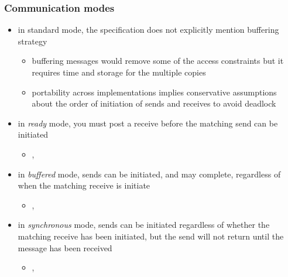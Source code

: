 \begin{frame}[fragile]
%
  \frametitle{Communication modes}
%
  \begin{itemize}
%
  \item in standard mode, the specification does not explicitly mention buffering strategy
    \begin{itemize}
    \item buffering messages would remove some of the access constraints but it requires time
      and storage for the multiple copies
    \item portability across implementations implies conservative assumptions about the order
      of initiation of sends and receives to avoid deadlock
    \end{itemize}
%
  \item in {\em ready} mode, you must post a receive before the matching send can be initiated
    \begin{itemize}
    \item {}, 
    \end{itemize}
%
  \item in {\em buffered} mode, sends can be initiated, and may complete, regardless of when
    the matching receive is initiate
    \begin{itemize}
    \item {}, 
    \end{itemize}
%
  \item in {\em synchronous} mode, sends can be initiated regardless of whether the matching
    receive has been initiated, but the send will not return until the message has been
    received
    \begin{itemize}
    \item {}, 
    \end{itemize}
  \end{itemize}
%
\end{frame}

